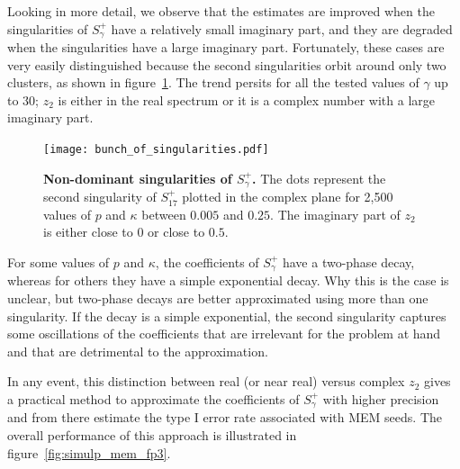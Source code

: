 \documentclass{article}
\begin{document}
Looking in more detail, we observe that the estimates are improved when
the singularities of $S^+_\gamma$ have a relatively small imaginary part,
and they are degraded when the singularities have a large imaginary part.
Fortunately, these cases are very easily distinguished because the second
singularities orbit around only two clusters, as shown in
figure~\ref{fig:bunch_of_singularities}. The trend persits for all the
tested values of $\gamma$ up to $30$; $z_2$ is either in the real spectrum
or it is a complex number with a large imaginary part.

\begin{figure}[h]
\centering
\texttt{[image: bunch\_of\_singularities.pdf]}
\caption{\textbf{Non-dominant singularities of $S^+_\gamma$.} The dots
represent the second singularity of $S^+_{17}$ plotted in the complex
plane for 2,500 values of $p$ and $\kappa$ between $0.005$ and $0.25$.
The imaginary part of $z_2$ is either close to $0$ or close to $0.5$.}
\label{fig:bunch_of_singularities}
\end{figure}


For some values of $p$ and $\kappa$, the coefficients of $S^+_\gamma$ have
a two-phase decay, whereas for others they have a simple exponential
decay. Why this is the case is unclear, but two-phase decays are better
approximated using more than one singularity. If the decay is a simple
exponential, the second singularity captures some oscillations of the
coefficients that are irrelevant for the problem at hand and that are
detrimental to the approximation.

In any event, this distinction between real (or near real) versus complex
$z_2$ gives a practical method to approximate the coefficients of
$S^+_\gamma$ with higher precision and from there estimate the type I
error rate associated with MEM seeds. The overall performance of this
approach is illustrated in figure~\ref{fig:simulp_mem_fp3}.
\end{document}
